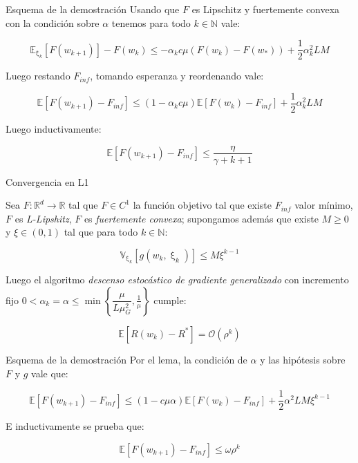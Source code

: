 \documentclass{beamer}
\newcommand{\R}{{\mathbb{R}}}
\newcommand{\N}{{\mathbb{N}}}
\newcommand{\sett}[1]{\left\lbrace#1\right\rbrace}
\newcommand{\expectation}[1]{\mathbb{E} \left[#1\right]}
\newcommand{\expectationsub}[2]{\mathbb{E}_{#1} \left[#2\right]}
\newcommand{\variancesub}[2]{\mathbb{V}_{#1} \left[#2\right]}
\newcommand{\expectationchik}[1]{\expectationsub{\upxi_{k}}{#1}}
\newcommand{\variancechik}[1]{\variancesub{\upxi_{k}}{#1}}
\begin{document}
\begin{frame}{Esquema de la demostraci\'on}
	Usando que $F$ es Lipschitz y fuertemente convexa con la condici\'on sobre $\alpha$ tenemos para todo $k \in \N$ vale:

\begin{equation*}
\expectationchik{F(w_{k+1})} - F(w_k) \leq  - \alpha_k c \mu \left(F(w_k) - F(w_*)\right) + \frac{1}{2} \alpha_k^2 L M
\end{equation*}

Luego restando $F_{inf}$, tomando esperanza y reordenando vale:

\begin{equation*}
\expectation{F(w_{k+1}) - F_{inf}} \leq \left(1 - \alpha_k c \mu \right) \expectation{F(w_{k}) - F_{inf}}  + \frac{1}{2} \alpha_k^2 L M
\end{equation*}

Luego inductivamente:

\begin{equation*}
\expectation{F(w_{k+1}) - F_{inf}} \leq \dfrac{\eta}{\gamma + k + 1}
\end{equation*}
\end{frame}

\begin{frame}{Convergencia en L1}
\begin{theorem}
	Sea $F: \R^d \rightarrow \R$ tal que $F \in C^1$ la funci\'on objetivo tal que existe $F_{inf}$ valor m\'inimo, $F$ es \textit{L-Lipshitz}, $F$ es \textit{fuertemente convexa}; supongamos adem\'as que existe $M \geq 0$ y $\xi \in (0,1)$ tal que para todo $k \in \N$:
	
	\begin{equation*}
	\variancechik{g(w_k, \upxi_{k})} \leq M \xi^{k-1}
	\end{equation*}
	
	Luego el algoritmo \textit{descenso estoc\'astico de gradiente generalizado} con incremento fijo $0  < \alpha_k = \alpha \leq \min\sett{\dfrac{\mu}{L \mu_G^2}, \frac{1}{ \mu}} $ cumple:
	
	\begin{equation*}
	\expectation{R(w_k) - R^*} = \mathcal{O} \left(\rho^{k}\right)
	\end{equation*}
	
\end{theorem}
\end{frame}

\begin{frame}{Esquema de la demostraci\'on}
	Por el lema, la condici\'on de $\alpha$ y las hip\'otesis sobre $F$ y $g$ vale que:
	
\begin{equation*}
\expectation{F(w_{k+1}) - F_{inf}} \leq \left(1 - c \mu \alpha\right) \expectation{F(w_k) - F_{inf}} + \frac{1}{2} \alpha^2 LM \xi^{k-1}
\end{equation*}

E inductivamente se prueba que:

\begin{equation*}
\expectation{F(w_{k+1}) - F_{inf}}  \leq  \omega \rho^{k}
\end{equation*}
\end{frame}
\end{document}
